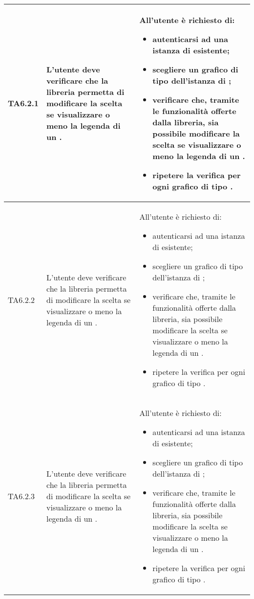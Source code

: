 \begin{longtabu}{| X[0.5] | X | X |}
	TA6.2.1 & L'utente  deve verificare che la libreria permetta di modificare la scelta se visualizzare o meno la legenda di un .
		
		& All'utente  è richiesto di:
		\begin{itemize}
			\item autenticarsi ad una istanza di \projectname{} esistente;
			\item scegliere un grafico di tipo  dell'istanza di \projectname{};
			\item verificare che, tramite le funzionalità offerte dalla libreria, sia possibile modificare la scelta se visualizzare o meno la legenda di un .
			\item ripetere la verifica per ogni grafico di tipo .
		\end{itemize}
\\ \hline

	TA6.2.2 & L'utente  deve verificare che la libreria permetta di modificare la scelta se visualizzare o meno la legenda di un .
		
		& All'utente  è richiesto di:
		\begin{itemize}
			\item autenticarsi ad una istanza di \projectname{} esistente;
			\item scegliere un grafico di tipo  dell'istanza di \projectname{};
			\item verificare che, tramite le funzionalità offerte dalla libreria, sia possibile modificare la scelta se visualizzare o meno la legenda di un .
			\item ripetere la verifica per ogni grafico di tipo .
		\end{itemize}
\\ \hline

	TA6.2.3 & L'utente  deve verificare che la libreria permetta di modificare la scelta se visualizzare o meno la legenda di un .
		
		& All'utente  è richiesto di:
		\begin{itemize}
			\item autenticarsi ad una istanza di \projectname{} esistente;
			\item scegliere un grafico di tipo  dell'istanza di \projectname{};
			\item verificare che, tramite le funzionalità offerte dalla libreria, sia possibile modificare la scelta se visualizzare o meno la legenda di un .
			\item ripetere la verifica per ogni grafico di tipo .
		\end{itemize}
\\ \hline


\end{longtabu}
